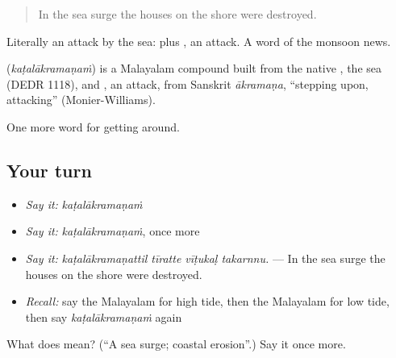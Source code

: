 \begin{quote}
In the sea surge the houses on the shore were destroyed.
\end{quote}

Literally an attack by the sea:  plus , an attack. A word of the monsoon news.

\begin{cousinweb}
\textbf{} (\emph{kaṭalākramaṇaṁ}) is a Malayalam compound built from the native , the sea (DEDR 1118), and , an attack, from Sanskrit \emph{ākramaṇa}, \textquotedblleft{}stepping upon, attacking\textquotedblright{} (Monier-Williams).
\end{cousinweb}

\begin{grammarlens}[title={What you've built}]
One more word for getting around.
\end{grammarlens}

\subsection*{Your turn}
\begin{itemize}
\raggedright
  \item \emph{Say it:} \emph{kaṭalākramaṇaṁ}
  \item \emph{Say it:} \emph{kaṭalākramaṇaṁ}, once more
  \item \emph{Say it:} \emph{kaṭalākramaṇattil tīratte vīṭukaḷ takarnnu.} — In the sea surge the houses on the shore were destroyed.
  \item \emph{Recall:} say the Malayalam for high tide, then the Malayalam for low tide, then say \emph{kaṭalākramaṇaṁ} again
\end{itemize}

\begin{tcolorbox}[breakable,colback=teal!4,colframe=teal!35!black,title={Before you move on}]
What does  mean? (\textquotedblleft{}A sea surge; coastal erosion\textquotedblright{}.) Say it once more.
\end{tcolorbox}
